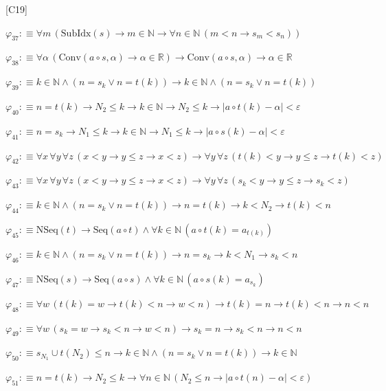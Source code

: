 \begin{fullproof}{[C19]}
\begin{abbrevlist}
\item $\varphi_{37} :\equiv \forall m\,(\mathrm{SubIdx}(s) \to m \in \mathbb{N} \to \forall n \in \mathbb{N}\,(m < n \to s_{m} < s_{n}))$
\item $\varphi_{38} :\equiv \forall \alpha\,(\mathrm{Conv}(a \circ s,\alpha) \to \alpha \in \mathbb{R}) \to \mathrm{Conv}(a \circ s,\alpha) \to \alpha \in \mathbb{R}$
\item $\varphi_{39} :\equiv k \in \mathbb{N} \land (n = s_{k} \lor n = t(k)) \to k \in \mathbb{N} \land (n = s_{k} \lor n = t(k))$
\item $\varphi_{40} :\equiv n = t(k) \to N_{2} \leq k \to k \in \mathbb{N} \to N_{2} \leq k \to \lvert a \circ t(k) - \alpha \rvert < \varepsilon$
\item $\varphi_{41} :\equiv n = s_{k} \to N_{1} \leq k \to k \in \mathbb{N} \to N_{1} \leq k \to \lvert a \circ s(k) - \alpha \rvert < \varepsilon$
\item $\varphi_{42} :\equiv \forall x\,\forall y\,\forall z\,(x < y \to y \leq z \to x < z) \to \forall y\,\forall z\,(t(k) < y \to y \leq z \to t(k) < z)$
\item $\varphi_{43} :\equiv \forall x\,\forall y\,\forall z\,(x < y \to y \leq z \to x < z) \to \forall y\,\forall z\,(s_{k} < y \to y \leq z \to s_{k} < z)$
\item $\varphi_{44} :\equiv k \in \mathbb{N} \land (n = s_{k} \lor n = t(k)) \to n = t(k) \to k < N_{2} \to t(k) < n$
\item $\varphi_{45} :\equiv \mathrm{NSeq}(t) \to \mathrm{Seq}(a \circ t) \land \forall k \in \mathbb{N}\,(a \circ t(k) = a_{t(k)})$
\item $\varphi_{46} :\equiv k \in \mathbb{N} \land (n = s_{k} \lor n = t(k)) \to n = s_{k} \to k < N_{1} \to s_{k} < n$
\item $\varphi_{47} :\equiv \mathrm{NSeq}(s) \to \mathrm{Seq}(a \circ s) \land \forall k \in \mathbb{N}\,(a \circ s(k) = a_{s_{k}})$
\item $\varphi_{48} :\equiv \forall w\,(t(k) = w \to t(k) < n \to w < n) \to t(k) = n \to t(k) < n \to n < n$
\item $\varphi_{49} :\equiv \forall w\,(s_{k} = w \to s_{k} < n \to w < n) \to s_{k} = n \to s_{k} < n \to n < n$
\item $\varphi_{50} :\equiv s_{N_{1}} \cup t(N_{2}) \leq n \to k \in \mathbb{N} \land (n = s_{k} \lor n = t(k)) \to k \in \mathbb{N}$
\item $\varphi_{51} :\equiv n = t(k) \to N_{2} \leq k \to \forall n \in \mathbb{N}\,(N_{2} \leq n \to \lvert a \circ t(n) - \alpha \rvert < \varepsilon)$

\end{abbrevlist}
\end{fullproof}
